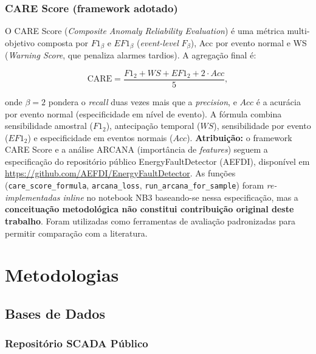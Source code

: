 \documentclass[12pt]{article}
\begin{document}
\subsubsection{CARE Score (framework adotado)}

\begin{sloppypar}
O CARE Score (\textit{Composite Anomaly Reliability Evaluation}) é uma métrica multi-objetivo composta por $F1_\beta$ e $EF1_\beta$ (\textit{event-level} $F_\beta$), Acc por evento normal e WS (\textit{Warning Score}, que penaliza alarmes tardios). A agregação final é:
\end{sloppypar}
\begin{equation}
    \mathrm{CARE} = \frac{F1_2 + WS + EF1_2 + 2 \cdot Acc}{5},
    \label{eq:care}
\end{equation}
\begin{sloppypar}
\noindent onde $\beta=2$ pondera o \textit{recall} duas vezes mais que a \textit{precision}, e $Acc$ é a acurácia por evento normal (especificidade em nível de evento). A fórmula combina sensibilidade amostral ($F1_2$), antecipação temporal ($WS$), sensibilidade por evento ($EF1_2$) e especificidade em eventos normais ($Acc$). \textbf{Atribuição:} o framework CARE Score e a análise ARCANA (importância de \textit{features}) seguem a especificação do repositório público EnergyFaultDetector (AEFDI), disponível em \url{https://github.com/AEFDI/EnergyFaultDetector}. As funções (\texttt{care\_score\_formula}, \texttt{arcana\_loss}, \texttt{run\_arcana\_for\_sample}) foram \emph{re-implementadas inline} no notebook NB3 baseando-se nessa especificação, mas a \textbf{conceituação metodológica não constitui contribuição original deste trabalho}. Foram utilizadas como ferramentas de avaliação padronizadas para permitir comparação com a literatura.
\end{sloppypar}

\section{Metodologias}

\subsection{Bases de Dados}

\subsubsection{Repositório SCADA Público}
\end{document}
